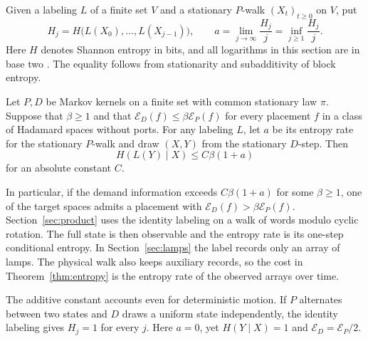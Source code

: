 Given a labeling $L$ of a finite set $V$ and a stationary $P$-walk
$(X_t)_{t\ge0}$ on $V$, put
\[
 H_j=H\big(L(X_0),\ldots,L(X_{j-1})\big),\qquad
 a=\lim_{j\to\infty}\frac{H_j}{j}=\inf_{j\ge1}\frac{H_j}{j}.
\]
Here \(H\) denotes Shannon entropy in bits, and all logarithms in this
section are in base two \cite{ct}. The equality follows from
stationarity and subadditivity of block entropy.

\begin{theorem}\label{thm:entropy}
Let $P,D$ be Markov kernels on a finite set with common stationary
law $\pi$. Suppose that $\beta\ge1$ and that
$\mathcal E_D(f)\le\beta\mathcal E_P(f)$ for every placement $f$ in
a class of Hadamard spaces without ports. For any labeling $L$, let $a$ be its entropy rate
for the stationary $P$-walk and draw $(X,Y)$ from the stationary
$D$-step. Then
\[
 H(L(Y)\mid X)\le C\beta(1+a)
\]
for an absolute constant $C$.
\end{theorem}

In particular, if the demand information exceeds \(C\beta(1+a)\)
for some \(\beta\ge1\), one of the target spaces admits a placement with
\(\mathcal E_D(f)>\beta\mathcal E_P(f)\). Section~\ref{sec:product}
uses the identity labeling on a walk of words modulo cyclic rotation.
The full state is then observable and the entropy rate is its
one-step conditional entropy. In Section~\ref{sec:lamps} the label
records only an array of lamps. The physical walk also keeps auxiliary
records, so the cost in Theorem~\ref{thm:entropy} is the entropy rate
of the observed arrays over time.

The additive constant accounts even for deterministic motion. If \(P\)
alternates between two states and \(D\) draws a uniform state
independently, the identity labeling gives \(H_j=1\) for every \(j\).
Here \(a=0\), yet \(H(Y\mid X)=1\) and
\(\mathcal E_D=\mathcal E_P/2\).

